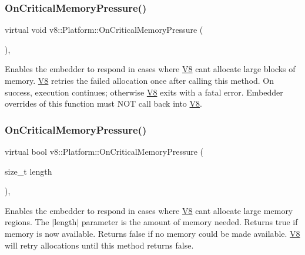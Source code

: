 \subsubsection{\texorpdfstring{On\+Critical\+Memory\+Pressure()}{OnCriticalMemoryPressure()}\hspace{0.1cm}{\footnotesize\ttfamily [1/2]}}
{\footnotesize\ttfamily virtual void v8\+::\+Platform\+::\+On\+Critical\+Memory\+Pressure (\begin{DoxyParamCaption}{ }\end{DoxyParamCaption})\hspace{0.3cm}{\ttfamily [inline]}, {\ttfamily [virtual]}}

Enables the embedder to respond in cases where \mbox{\hyperlink{classv8_1_1V8}{V8}} can\textquotesingle{}t allocate large blocks of memory. \mbox{\hyperlink{classv8_1_1V8}{V8}} retries the failed allocation once after calling this method. On success, execution continues; otherwise \mbox{\hyperlink{classv8_1_1V8}{V8}} exits with a fatal error. Embedder overrides of this function must N\+OT call back into \mbox{\hyperlink{classv8_1_1V8}{V8}}. \mbox{\label{classv8_1_1Platform_a0de4b8a7bb8865ce65beb5afbaabe4cc}} 
\subsubsection{\texorpdfstring{On\+Critical\+Memory\+Pressure()}{OnCriticalMemoryPressure()}\hspace{0.1cm}{\footnotesize\ttfamily [2/2]}}
{\footnotesize\ttfamily virtual bool v8\+::\+Platform\+::\+On\+Critical\+Memory\+Pressure (\begin{DoxyParamCaption}\item[{size\+\_\+t}]{length }\end{DoxyParamCaption})\hspace{0.3cm}{\ttfamily [inline]}, {\ttfamily [virtual]}}

Enables the embedder to respond in cases where \mbox{\hyperlink{classv8_1_1V8}{V8}} can\textquotesingle{}t allocate large memory regions. The $\vert$length$\vert$ parameter is the amount of memory needed. Returns true if memory is now available. Returns false if no memory could be made available. \mbox{\hyperlink{classv8_1_1V8}{V8}} will retry allocations until this method returns false.

